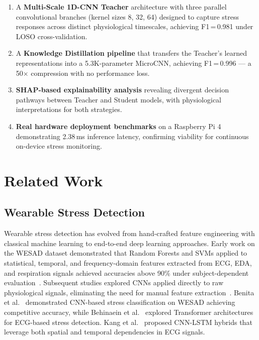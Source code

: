 \documentclass[conference]{IEEEtran}
\begin{document}
\begin{enumerate}
    \item A \textbf{Multi-Scale 1D-CNN Teacher} architecture with three parallel convolutional branches (kernel sizes 8, 32, 64) designed to capture stress responses across distinct physiological timescales, achieving F1\,=\,0.981 under LOSO cross-validation.
    \item A \textbf{Knowledge Distillation pipeline} that transfers the Teacher's learned representations into a 5.3K-parameter MicroCNN, achieving F1\,=\,0.996 --- a 50$\times$ compression with no performance loss.
    \item \textbf{SHAP-based explainability analysis} revealing divergent decision pathways between Teacher and Student models, with physiological interpretations for both strategies.
    \item \textbf{Real hardware deployment benchmarks} on a Raspberry Pi 4 demonstrating 2.38\,ms inference latency, confirming viability for continuous on-device stress monitoring.
\end{enumerate}

\section{Related Work}

\subsection{Wearable Stress Detection}

Wearable stress detection has evolved from hand-crafted feature engineering with classical machine learning to end-to-end deep learning approaches. Early work on the WESAD dataset demonstrated that Random Forests and SVMs applied to statistical, temporal, and frequency-domain features extracted from ECG, EDA, and respiration signals achieved accuracies above 90\% under subject-dependent evaluation~\cite{schmidt2018introducing}. Subsequent studies explored CNNs applied directly to raw physiological signals, eliminating the need for manual feature extraction~\cite{dziezyc2020can, li2020stress, abdelfattah2025machine}. Benita et al.~\cite{benita2024stress} demonstrated CNN-based stress classification on WESAD achieving competitive accuracy, while Behinaein et al.~\cite{behinaein2021transformer} explored Transformer architectures for ECG-based stress detection. Kang et al.~\cite{kang2021classification} proposed CNN-LSTM hybrids that leverage both spatial and temporal dependencies in ECG signals.
\end{document}
